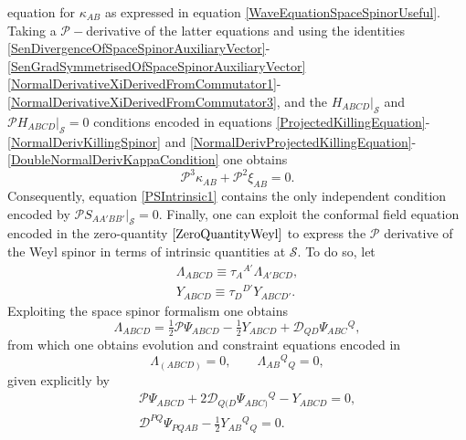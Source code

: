 \documentclass[10pt,a4paper]{article}
\theoremstyle{plain}
\begin{document}
equation for $\kappa_{AB}$ as expressed in equation
\eqref{WaveEquationSpaceSpinorUseful}. Taking a
$\mathcal{P}-$derivative of the latter equations and using the
identities
\eqref{SenDivergenceOfSpaceSpinorAuxiliaryVector}-\eqref{SenGradSymmetrisedOfSpaceSpinorAuxiliaryVector}
\eqref{NormalDerivativeXiDerivedFromCommutator1}-\eqref{NormalDerivativeXiDerivedFromCommutator3},
and the $H_{ABCD}|_{\mathcal{S}}$ and
$\mathcal{P}H_{ABCD}|_{\mathcal{S}}=0$ conditions encoded in equations
\eqref{ProjectedKillingEquation}-\eqref{NormalDerivKillingSpinor} and
\eqref{NormalDerivProjectedKillingEquation}-\eqref{DoubleNormalDerivKappaCondition}
one obtains
\[
\mathcal{P}^{3}\kappa_{AB}+\mathcal{P}^{2}\xi_{AB}=0.
\]
Consequently, equation \eqref{PSIntrinsic1} contains the only
independent condition encoded by $\mathcal{P}S_{AA'BB'}|_{\mathcal{S}}=0$.
 Finally, one can exploit the conformal field equation encoded
in the zero-quantity $\eqref{ZeroQuantityWeyl}$ to express the
$\mathcal{P}$ derivative of the Weyl spinor in terms of intrinsic
quantities at $\mathcal{S}$.  To do so, let
\begin{align*}
\Lambda_{ABCD}\equiv \tau_{A}{}^{A'}\Lambda_{A'BCD}, \\ Y_{ABCD}\equiv
\tau_{D}{}^{D'}Y_{ABCD'}.
\end{align*}
Exploiting the space spinor formalism one obtains
\begin{equation*}
\Lambda_{ABCD} =\tfrac{1}{2}\mathcal{P}\Psi_{ABCD}
-\tfrac{1}{2}Y_{ABCD}+\mathcal{D}_{QD}\Psi_{ABC}{}^{Q},
\end{equation*}
from which one obtains evolution and constraint equations encoded in
\[ \Lambda_{(ABCD)}=0, \qquad  \Lambda_{AB}{}^{Q}{}_{Q}=0, \]
given explicitly by
\begin{subequations}
\begin{eqnarray}
&& \mathcal{P}\Psi_{ABCD}+2\mathcal{D}_{Q(D}\Psi_{ABC)}{}^{Q}
  -Y_{ABCD}=0,\label{ZeroQuantityWeylEvolution}\\
&&  \mathcal{D}^{PQ}\Psi_{PQAB}-\tfrac{1}{2}Y_{AB}{}^{Q}{}_{Q}=0.\label{ZeroQuantityWeylConstraint}
\end{eqnarray}
\end{subequations}
\end{document}
